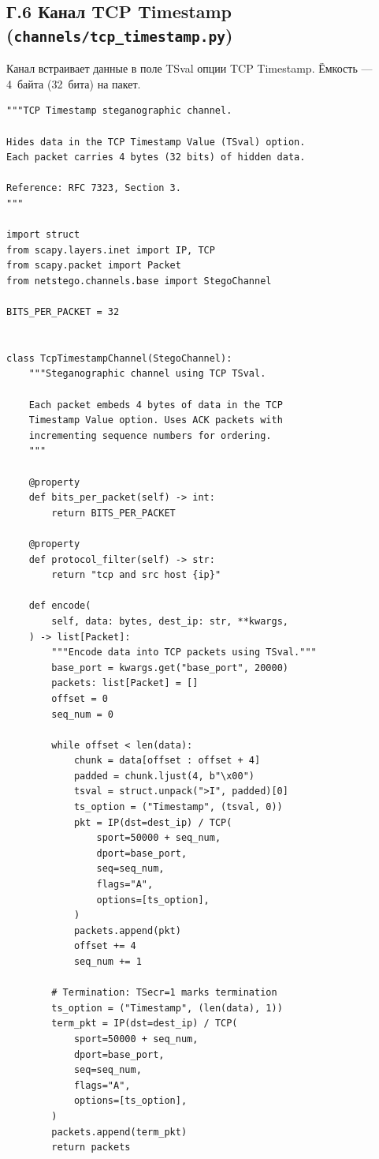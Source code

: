 \newpage
\subsection*{Г.6 Канал TCP Timestamp (\texttt{channels/tcp\_timestamp.py})}

Канал встраивает данные в поле TSval опции TCP Timestamp.
Ёмкость --- 4~байта (32~бита) на пакет.

\begin{lstlisting}[style=appendixcode]
"""TCP Timestamp steganographic channel.

Hides data in the TCP Timestamp Value (TSval) option.
Each packet carries 4 bytes (32 bits) of hidden data.

Reference: RFC 7323, Section 3.
"""

import struct
from scapy.layers.inet import IP, TCP
from scapy.packet import Packet
from netstego.channels.base import StegoChannel

BITS_PER_PACKET = 32


class TcpTimestampChannel(StegoChannel):
    """Steganographic channel using TCP TSval.

    Each packet embeds 4 bytes of data in the TCP
    Timestamp Value option. Uses ACK packets with
    incrementing sequence numbers for ordering.
    """

    @property
    def bits_per_packet(self) -> int:
        return BITS_PER_PACKET

    @property
    def protocol_filter(self) -> str:
        return "tcp and src host {ip}"

    def encode(
        self, data: bytes, dest_ip: str, **kwargs,
    ) -> list[Packet]:
        """Encode data into TCP packets using TSval."""
        base_port = kwargs.get("base_port", 20000)
        packets: list[Packet] = []
        offset = 0
        seq_num = 0

        while offset < len(data):
            chunk = data[offset : offset + 4]
            padded = chunk.ljust(4, b"\x00")
            tsval = struct.unpack(">I", padded)[0]
            ts_option = ("Timestamp", (tsval, 0))
            pkt = IP(dst=dest_ip) / TCP(
                sport=50000 + seq_num,
                dport=base_port,
                seq=seq_num,
                flags="A",
                options=[ts_option],
            )
            packets.append(pkt)
            offset += 4
            seq_num += 1

        # Termination: TSecr=1 marks termination
        ts_option = ("Timestamp", (len(data), 1))
        term_pkt = IP(dst=dest_ip) / TCP(
            sport=50000 + seq_num,
            dport=base_port,
            seq=seq_num,
            flags="A",
            options=[ts_option],
        )
        packets.append(term_pkt)
        return packets


\end{lstlisting}
